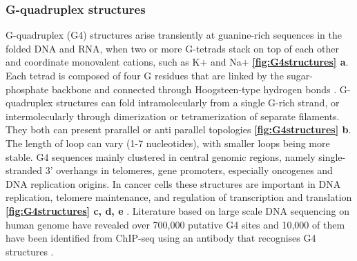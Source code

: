  \subsubsection{G-quadruplex structures}
G-quadruplex (G4) structures arise transiently at guanine-rich sequences in the folded DNA and RNA, when two or more G-tetrads stack on top of each other and coordinate monovalent cations, such as K+ and Na+ \cite{sen1990sodium} \textbf{\autoref{fig:G4structures} a}. Each tetrad is composed of four G residues that are linked by the sugar-phosphate backbone and connected through Hoogsteen-type hydrogen bonds \cite{kwok2017g}. G-quadruplex structures can fold intramolecularly from a single G-rich strand, or intermolecularly through dimerization or tetramerization of separate filaments. They both can present prarallel or anti parallel topologies \textbf{\autoref{fig:G4structures} b}. The length of loop can vary (1-7 nucleotides), with smaller loops being more stable\cite{huppert2010structure}.
G4 sequences mainly clustered in central genomic regions, namely single-stranded 3' overhangs in telomeres, gene promoters, especially oncogenes and DNA replication origins. In cancer cells these structures are important in DNA replication, telomere maintenance, and regulation of transcription and translation \textbf{\autoref{fig:G4structures} c, d, e} \cite{rhodes2015g, maizels2013g4}. Literature based on large scale DNA sequencing on human genome have revealed over 700,000 putative G4 sites and 10,000 of them have been identified from ChIP-seq using an antibody that recognises G4 structures \cite{siddiqui2002direct, granotier2005preferential, chambers2015high, hansel2016g}.

